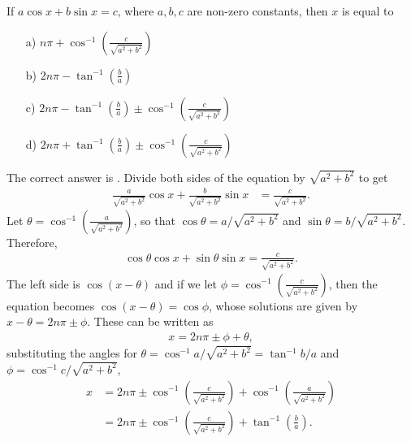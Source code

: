 \begin{question}
    If $a \cos x + b \sin x = c$, where $a,b,c$ are non-zero constants, then $x$ is equal to
    \begin{enumerate}
        \item[a)] $\displaystyle n\pi + \cos^{-1}\left(\frac{c}{\sqrt{a^2+b^2}}\right)$
        \item[b)] $\displaystyle 2n\pi - \tan^{-1}\left(\frac{b}{a}\right)$
        \item[c)] $\displaystyle 2n\pi - \tan^{-1}\left(\frac{b}{a}\right) \pm \cos^{-1}\left(\frac{c}{\sqrt{a^2+b^2}}\right)$
        \item[d)] \correct $\displaystyle 2n\pi + \tan^{-1}\left(\frac{b}{a}\right) \pm \cos^{-1}\left(\frac{c}{\sqrt{a^2+b^2}}\right)$
    \end{enumerate}
\end{question}
\begin{solution}
    The correct answer is \correct. Divide both sides of the equation by $\sqrt{a^2+b^2}$ to get
    \begin{align*}
        \frac{a}{\sqrt{a^2+b^2}} \cos x + \frac{b}{\sqrt{a^2+b^2}}\sin x &= \frac{c}{\sqrt{a^2+b^2}}.
    \end{align*}
    Let $\theta = \cos^{-1}\left(\frac{a}{\sqrt{a^2+b^2}}\right)$, so that $\cos \theta = a/\sqrt{a^2+b^2}$ and $\sin \theta = b/\sqrt{a^2+b^2}$. Therefore, 
    \begin{align*}
         \cos \theta \cos x + \sin \theta \sin x = \frac{c}{\sqrt{a^2+b^2}}.
    \end{align*}
    The left side is $\cos(x-\theta)$ and if we let $\phi = \cos^{-1}\left(\frac{c}{\sqrt{a^2+b^2}}\right)$, then the equation becomes $\cos(x-\theta)=\cos \phi$, whose solutions are given by $x - \theta = 2n\pi \pm \phi$. These can be written as
    \begin{align*}
        x=2n\pi \pm \phi + \theta,
    \end{align*}
    substituting the angles for $\theta = \cos^{-1} a/\sqrt{a^2+b^2}=\tan^{-1} b/a$ and $\phi = \cos^{-1}c/\sqrt{a^2+b^2}$,
    \begin{align*}
        x &=2n\pi \pm \cos^{-1}\left(\frac{c}{\sqrt{a^2+b^2}}\right) + \cos^{-1}\left(\frac{a}{\sqrt{a^2+b^2}}\right)\\
        &= 2n\pi \pm \cos^{-1}\left(\frac{c}{\sqrt{a^2+b^2}}\right) + \tan^{-1}\left(\frac{b}{a}\right).
    \end{align*}
\end{solution}

